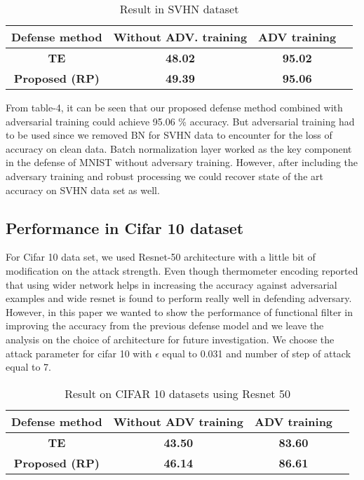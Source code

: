 \documentclass[conference]{IEEEtran}
\begin{document}
\begin{table}[h]
\centering
\caption{Result in SVHN dataset}
\label{coding}
\begin{tabular}{@{}cccc@{}}
\toprule
\textbf{Defense method}  & \textbf{Without ADV. training} & \textbf{ADV training} \\ \midrule
\textbf{TE \cite{anonymous2018thermometer}} & \textbf{48.02} & \textbf{95.02} \\ \midrule
\textbf{Proposed (RP)} & \textbf{49.39} & \textbf{95.06} \\ 
\bottomrule
\end{tabular}
\end{table}

From table-4, it can be seen that our proposed defense method combined with adversarial training could achieve 95.06 \% accuracy. But adversarial training had to be used since we removed BN for SVHN data to encounter for the loss of accuracy on clean data. Batch normalization layer worked as the key component in the defense of MNIST without adversary training. However, after including the adversary training and robust processing we could recover state of the art accuracy on SVHN data set as well.

\subsection{Performance in Cifar 10 dataset}

For Cifar 10 data set, we used Resnet-50 architecture with a little bit of modification on the attack strength. Even though thermometer encoding reported that using wider network helps in increasing the accuracy against adversarial examples and wide resnet is found to perform really well in defending adversary. However, in this paper we wanted to show the performance of functional filter in improving the accuracy from the previous defense model and we leave the analysis on the choice of architecture for future investigation. We choose the attack parameter for cifar 10 with $\epsilon$ equal to 0.031 and number of step of attack equal to 7.

\begin{table}[h]
\centering
\caption{Result on CIFAR 10 datasets using Resnet 50}
\label{coding}
\begin{tabular}{@{}cccc@{}}
\toprule
\textbf{Defense method}  & \textbf{Without ADV training} & \textbf{ADV training}  \\ \midrule
\textbf{TE \cite{anonymous2018thermometer}} & \textbf{43.50} & \textbf{83.60} \\ \midrule
\textbf{Proposed (RP)} & \textbf{46.14} & \textbf{86.61} \\ 
\bottomrule
\end{tabular}
\end{table}
\end{document}
